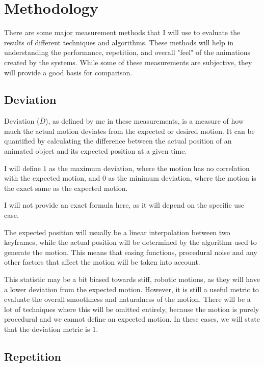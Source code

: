 \section{Methodology}
\label{sec:methodology}

There are some major measurement methods that I will use to evaluate the results of different techniques and algorithms. These methods will help in understanding the performance, repetition, and overall "feel" of the animations created by the systems. While some of these measurements are subjective, they will provide a good basis for comparison.

\subsection{Deviation}
\label{subsec:deviation}

Deviation (\(\bar{D}\)), as defined by me in these measurements, is a measure of how much the actual motion deviates from the expected or desired motion. It can be quantified by calculating the difference between the actual position of an animated object and its expected position at a given time. 

I will define \(1\) as the maximum deviation, where the motion has no correlation with the expected motion, and \(0\) as the minimum deviation, where the motion is the exact same as the expected motion.

I will not provide an exact formula here, as it will depend on the specific use case.

The expected position will usually be a linear interpolation between two keyframes, while the actual position will be determined by the algorithm used to generate the motion. This means that easing functions, procedural noise and any other factors that affect the motion will be taken into account.

This statistic may be a bit biased towards stiff, robotic motions, as they will have a lower deviation from the expected motion. However, it is still a useful metric to evaluate the overall smoothness and naturalness of the motion. There will be a lot of techniques where this will be omitted entirely, because the motion is purely procedural and we cannot define an expected motion. In these cases, we will state that the deviation metric is \(1\).

\subsection{Repetition}
\label{subsec:repetition}

